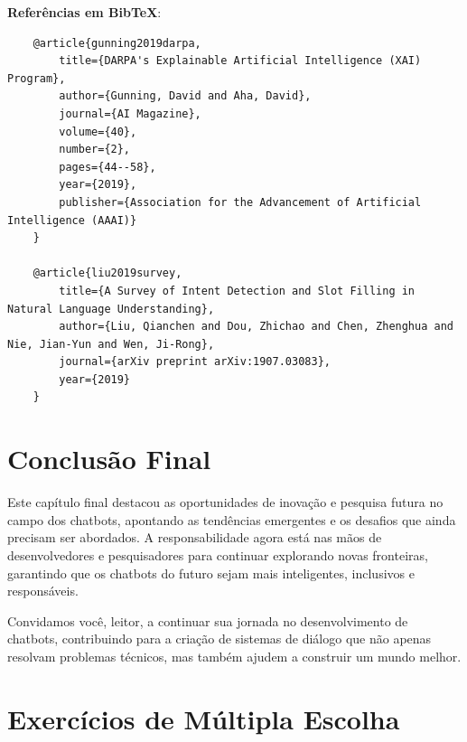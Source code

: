 \documentclass[14pt,a4paper,oneside]{book}
\begin{document}
\textbf{Referências em BibTeX}:

\begin{verbatim}
	@article{gunning2019darpa,
		title={DARPA's Explainable Artificial Intelligence (XAI) Program},
		author={Gunning, David and Aha, David},
		journal={AI Magazine},
		volume={40},
		number={2},
		pages={44--58},
		year={2019},
		publisher={Association for the Advancement of Artificial Intelligence (AAAI)}
	}
	
	@article{liu2019survey,
		title={A Survey of Intent Detection and Slot Filling in Natural Language Understanding},
		author={Liu, Qianchen and Dou, Zhichao and Chen, Zhenghua and Nie, Jian-Yun and Wen, Ji-Rong},
		journal={arXiv preprint arXiv:1907.03083},
		year={2019}
	}
\end{verbatim}

\section{Conclusão Final}

Este capítulo final destacou as oportunidades de inovação e pesquisa futura no campo dos chatbots, apontando as tendências emergentes e os desafios que ainda precisam ser abordados. A responsabilidade agora está nas mãos de desenvolvedores e pesquisadores para continuar explorando novas fronteiras, garantindo que os chatbots do futuro sejam mais inteligentes, inclusivos e responsáveis.

Convidamos você, leitor, a continuar sua jornada no desenvolvimento de chatbots, contribuindo para a criação de sistemas de diálogo que não apenas resolvam problemas técnicos, mas também ajudem a construir um mundo melhor.

\section*{Exercícios de Múltipla Escolha}
\end{document}
